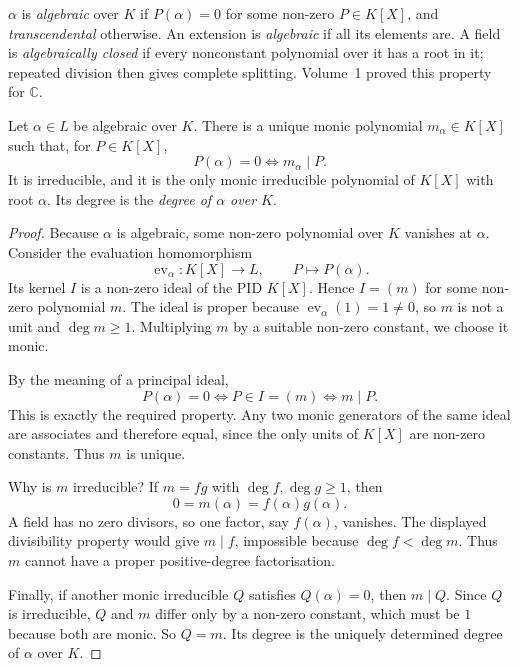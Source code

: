 \begin{definition}
$\alpha$ is \emph{algebraic} over $K$ if $P(\alpha)=0$ for some non-zero $P\in K[X]$, and \emph{transcendental} otherwise. An extension is \emph{algebraic} if all its elements are. A field is
\emph{algebraically closed} if every nonconstant polynomial over it has a root
in it; repeated division then gives complete splitting. Volume~1 proved this
property for $\mathbb C$.
\end{definition}

\begin{proposition}\label{prop:minpoly}
Let $\alpha\in L$ be algebraic over $K$. There is a unique monic polynomial $m_\alpha\in K[X]$ such that, for $P\in K[X]$,
\[
P(\alpha)=0\iff m_\alpha\mid P.
\]
It is irreducible, and it is the only monic irreducible polynomial of $K[X]$ with root $\alpha$. Its degree is the \emph{degree of $\alpha$ over $K$}.
\end{proposition}
\begin{proof}
Because $\alpha$ is algebraic,
some non-zero polynomial over $K$
vanishes at $\alpha$. Consider
the evaluation homomorphism
\[
\operatorname{ev}_{\alpha}:K[X]\to L,
\qquad P\mapsto P(\alpha).
\]
Its kernel $I$ is a non-zero ideal
of the PID $K[X]$. Hence $I=(m)$
for some non-zero polynomial $m$. The ideal is proper because
$\operatorname{ev}_{\alpha}(1)=1\ne0$, so $m$ is not a unit and
$\deg m\ge1$. Multiplying $m$ by a suitable non-zero
constant, we choose it monic.

By the meaning of a principal ideal,
\[
P(\alpha)=0
\iff P\in I=(m)
\iff m\mid P.
\]
This is exactly the required property.
Any two monic generators of the same ideal
are associates and therefore equal, since
the only units of $K[X]$ are non-zero
constants. Thus $m$ is unique.

Why is $m$ irreducible? If $m=fg$
with $\deg f,\deg g\ge1$, then
\[
0=m(\alpha)=f(\alpha)g(\alpha).
\]
A field has no zero divisors, so
one factor, say $f(\alpha)$, vanishes.
The displayed divisibility property
would give $m\mid f$, impossible because
$\deg f<\deg m$. Thus $m$ cannot
have a proper positive-degree factorisation.

Finally, if another monic irreducible
$Q$ satisfies $Q(\alpha)=0$,
then $m\mid Q$. Since $Q$ is irreducible,
$Q$ and $m$ differ only by a non-zero
constant, which must be $1$ because
both are monic. So $Q=m$.
Its degree is the uniquely determined
degree of $\alpha$ over $K$.
\end{proof}

